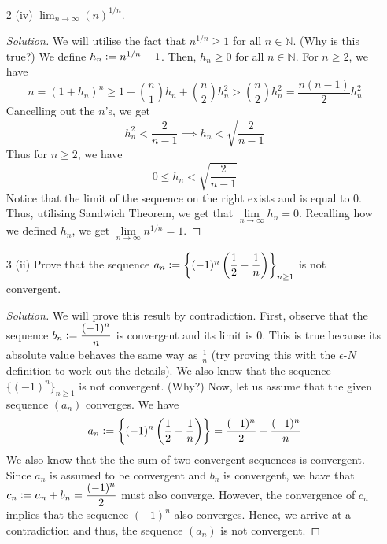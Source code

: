 \documentclass[12pt]{article}
\def\ddfrac#1#2{\displaystyle\frac{\displaystyle #1}{\displaystyle #2}}
\theoremstyle{definition}
\newenvironment{soln}{\begin{proof}[Solution]}{\end{proof}}
\begin{document}
\begin{enumerate}[leftmargin=*]
    \itemsep0.5em
    \item[2 (iv)] $\displaystyle\lim_{n\to \infty}(n)^{1/n}.$
    \begin{soln}
        We will utilise the fact that $n^{1/n} \geq 1$ for all $n \in \mathbb{N}$. (Why is this true?) We define $h_n \vcentcolon= n^{1/n} - 1$. Then, $h_n \geq 0$ for all $n \in \mathbb{N}$. For $n\geq2$, we have
        \[
            n = (1+h_n)^n \geq 1 + \binom{n}{1} h_n + \binom{n}{2} h_n^2 > \binom{n}{2} h_n^2 = \frac{n(n-1)}{2} h_n^2
        \]
        Cancelling out the $n$'s, we get
        \[
            h_n^2 < \frac{2}{n-1} \implies h_n < \sqrt{\frac{2}{n-1}}
        \]  
        Thus for $n \geq 2$, we have
        \[
            0 \leq h_n < \sqrt{\frac{2}{n-1}}
        \]
        Notice that the limit of the sequence on the right exists and is equal to $0$. Thus, utilising Sandwich Theorem, we get that $\lim\limits_{n \to \infty} h_n = 0$. Recalling how we defined $h_n$, we get $\lim\limits_{n \to \infty} n^{1/n} = 1$.
    \end{soln}
    
    \newpage
    
    \item[3 (ii)] Prove that the sequence $a_n \vcentcolon= \left\{ (-1)^n \left( \ddfrac{1}{2} - \ddfrac{1}{n} \right) \right\}_{n \geq 1}$ is not convergent.
    
    \begin{soln}
        We will prove this result by contradiction. First, observe that the sequence $b_n \vcentcolon= \ddfrac{(-1)^n}{n}$ is convergent and its limit is $0$. This is true because its absolute value behaves the same way as $\ddfrac{1}{n}$ (try proving this with the $\epsilon$-$N$ definition to work out the details). We also know that the sequence $\{(-1)^n\}_{n \geq 1}$ is not convergent. (Why?) Now, let us assume that the given sequence $(a_n)$ converges. We have
        \[
            a_n \vcentcolon= \left\{ (-1)^n \left( \ddfrac{1}{2} - \ddfrac{1}{n} \right) \right\} = \frac{(-1)^n}{2} - \frac{(-1)^n}{n}
        \]
        We also know that the the sum of two convergent sequences is convergent. Since $a_n$ is assumed to be convergent and $b_n$ is convergent, we have that $c_n \vcentcolon= a_n + b_n = \ddfrac{(-1)^n}{2}$ must also converge. However, the convergence of $c_n$ implies that the sequence $(-1)^n$ also converges. Hence, we arrive at a contradiction and thus, the sequence $(a_n)$ is not convergent.
        

\end{soln}
\end{enumerate}
\end{document}
